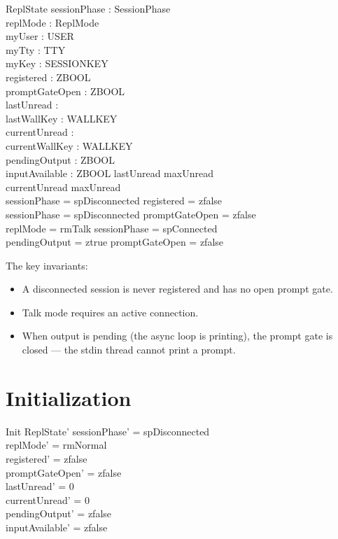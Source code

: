 \documentclass[a4paper,10pt,fleqn]{article}
\begin{document}
\begin{schema}{ReplState}
  sessionPhase : SessionPhase \\
  replMode : ReplMode \\
  myUser : USER \\
  myTty : TTY \\
  myKey : SESSIONKEY \\
  registered : ZBOOL \\
  promptGateOpen : ZBOOL \\
  lastUnread : \nat \\
  lastWallKey : WALLKEY \\
  currentUnread : \nat \\
  currentWallKey : WALLKEY \\
  pendingOutput : ZBOOL \\
  inputAvailable : ZBOOL
\where
  lastUnread \leq maxUnread \\
  currentUnread \leq maxUnread \\
  sessionPhase = spDisconnected \implies registered = zfalse \\
  sessionPhase = spDisconnected \implies promptGateOpen = zfalse \\
  replMode = rmTalk \implies sessionPhase = spConnected \\
  pendingOutput = ztrue \implies promptGateOpen = zfalse
\end{schema}

The key invariants:
\begin{itemize}
\item A disconnected session is never registered and has no open
  prompt gate.
\item Talk mode requires an active connection.
\item When output is pending (the async loop is printing), the prompt
  gate is closed --- the stdin thread cannot print a prompt.
\end{itemize}

\section{Initialization}

\begin{schema}{Init}
  ReplState'
\where
  sessionPhase' = spDisconnected \\
  replMode' = rmNormal \\
  registered' = zfalse \\
  promptGateOpen' = zfalse \\
  lastUnread' = 0 \\
  currentUnread' = 0 \\
  pendingOutput' = zfalse \\
  inputAvailable' = zfalse
\end{schema}
\end{document}

